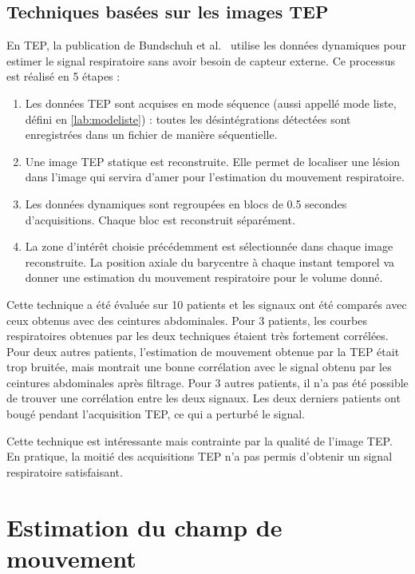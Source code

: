 \subsection{Techniques basées sur les images TEP}
\label{lab:estimMvtTEP}
En TEP, la publication de Bundschuh et al.~\cite{bundschuh2007postacquisition} utilise les données dynamiques pour estimer le signal respiratoire sans avoir besoin de capteur externe. Ce processus est réalisé en 5 étapes : 

\begin{enumerate}
 \item Les données TEP sont acquises en mode séquence (aussi appellé mode liste, défini en \ref{lab:modeliste}) : toutes les désintégrations détectées sont enregistrées dans un fichier de manière séquentielle.
 \item Une image TEP statique est reconstruite. Elle permet de localiser une lésion dans l'image qui servira d'amer pour l'estimation du mouvement respiratoire.
 \item Les données dynamiques sont regroupées en blocs de 0.5 secondes d'acquisitions. Chaque bloc est reconstruit séparément. 
 \item La zone d'intérêt choisie précédemment est sélectionnée dans chaque image reconstruite. La position axiale du barycentre à chaque instant temporel va donner une estimation du mouvement respiratoire pour le volume donné.
\end{enumerate}

Cette technique a été évaluée sur 10 patients et les signaux ont été comparés avec ceux obtenus avec des ceintures abdominales. Pour 3 patients, les courbes respiratoires obtenues par les deux techniques étaient très fortement corrélées. Pour deux autres patients, l'estimation de mouvement obtenue par la TEP était trop bruitée, mais montrait une bonne corrélation avec le signal obtenu par les ceintures abdominales après filtrage. Pour 3 autres patients, il n'a pas été possible de trouver une corrélation entre les deux signaux. Les deux derniers patients ont bougé pendant l'acquisition TEP, ce qui a perturbé le signal.

Cette technique est intéressante mais contrainte par la qualité de l'image TEP. En pratique, la moitié des acquisitions TEP n'a pas permis d'obtenir un signal respiratoire satisfaisant.


\section{Estimation du champ de mouvement}
\label{lab:estimChamp}

